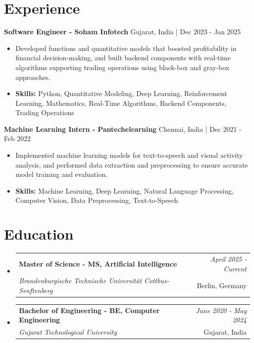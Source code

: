 \documentclass[a4paper,11pt]{article}
\makeatletter
\newcommand{\resumeSubheading}[4]{
\vspace{0.5mm}\item
    \begin{tabular*}{0.98\textwidth}[t]{l@{\extracolsep{\fill}}r}
        \textbf{#1} & \textit{\footnotesize{#4}} \\
        \textit{\footnotesize{#3}} &  \footnotesize{#2}\\
    \end{tabular*}
    \vspace{-2.4mm}
}
\makeatother
\begin{document}
\section{\textbf{Experience}}


\vspace{1mm}
  \textbf{Software Engineer - Soham Infotech} \hfill Gujarat, India | Dec 2023 - Jan 2025
\vspace{-1.5mm} %
\begin{itemize}
  \item Developed functions and quantitative models that boosted profitability in financial decision-making, and built backend components with real-time algorithms supporting trading operations using black-box and gray-box approaches.

\vspace{-2mm}
  \item \textbf{Skills:} Python, Quantitative Modeling, Deep Learning, Reinforcement Learning, Mathematics, Real-Time Algorithms, Backend Components, Trading Operations
\end{itemize}

\vspace{1mm}
  \textbf{Machine Learning Intern - Pantechelearning} \hfill Chennai, India | Dec 2021 - Feb 2022
\vspace{-1.5mm} %
\begin{itemize}
  \item Implemented machine learning models for text-to-speech and visual activity analysis, and performed data extraction and preprocessing to ensure accurate model training and evaluation.
\vspace{-2mm}
  \item \textbf{Skills:} Machine Learning, Deep Learning, Natural Language Processing, Computer Vision, Data Preprocessing, Text-to-Speech
\end{itemize}\section{\textbf{Education}}
\vspace{-0.4mm}

\begin{itemize}
\resumeSubheading
{Master of Science - MS, Artificial Intelligence }{Berlin, Germany}
{Brandenburgische Technische Universität Cottbus-Senftenberg  }{April 2025 - Current}

\vspace{1.0mm} %
\resumeSubheading
{Bachelor of Engineering - BE, Computer Engineering  }{Gujarat, India}
{Gujarat Technological University }{June 2020 - May 2024}

\end{itemize}
\end{document}
